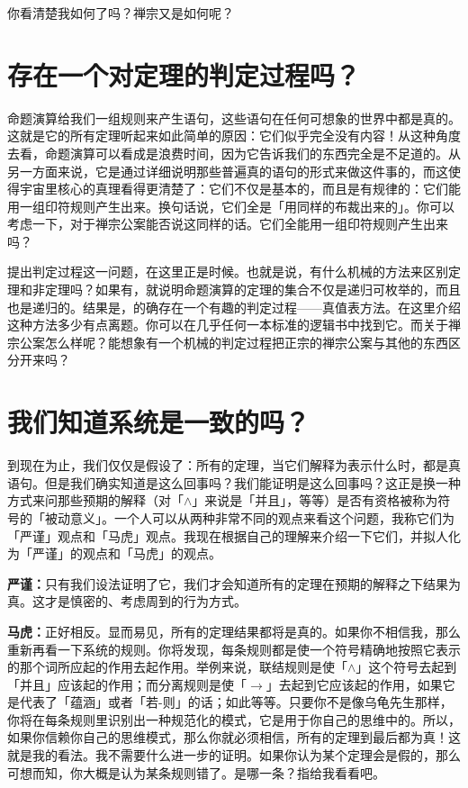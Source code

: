 \documentclass[
  12pt,
  twoside,
  openright,
  oldfontcommands,
]{memoir}
\newcommand{\dialogname}[1]{{\heifamily\bfseries #1}}
\begin{document}
你看清楚我如何了吗？禅宗又是如何呢？

\section{存在一个对定理的判定过程吗？}

命题演算给我们一组规则来产生语句，这些语句在任何可想象的世界中都是真的。这就是它的所有定理听起来如此简单的原因：它们似乎完全没有内容！从这种角度去看，命题演算可以看成是浪费时间，因为它告诉我们的东西完全是不足道的。从另一方面来说，它是通过详细说明那些普遍真的语句的形式来做这件事的，而这使得宇宙里核心的真理看得更清楚了：它们不仅是基本的，而且是有规律的：它们能用一组印符规则产生出来。换句话说，它们全是「用同样的布裁出来的」。你可以考虑一下，对于禅宗公案能否说这同样的话。它们全能用一组印符规则产生出来吗？

提出判定过程这一问题，在这里正是时候。也就是说，有什么机械的方法来区别定理和非定理吗？如果有，就说明命题演算的定理的集合不仅是递归可枚举的，而且也是递归的。结果是，的确存在一个有趣的判定过程------真值表方法。在这里介绍这种方法多少有点离题。你可以在几乎任何一本标准的逻辑书中找到它。而关于禅宗公案怎么样呢？能想象有一个机械的判定过程把正宗的禅宗公案与其他的东西区分开来吗？

\section{我们知道系统是一致的吗？}

到现在为止，我们仅仅是假设了：所有的定理，当它们解释为表示什么时，都是真语句。但是我们确实知道是这么回事吗？我们能证明是这么回事吗？这正是换一种方式来问那些预期的解释（对「$\wedge$」来说是「并且」，等等）是否有资格被称为符号的「被动意义」。一个人可以从两种非常不同的观点来看这个问题，我称它们为「严谨」观点和「马虎」观点。我现在根据自己的理解来介绍一下它们，并拟人化为「严谨」的观点和「马虎」的观点。

\dialogname{严谨：}只有我们设法证明了它，我们才会知道所有的定理在预期的解释之下结果为真。这才是慎密的、考虑周到的行为方式。

\dialogname{马虎：}正好相反。显而易见，所有的定理结果都将是真的。如果你不相信我，那么重新再看一下系统的规则。你将发现，每条规则都是使一个符号精确地按照它表示的那个词所应起的作用去起作用。举例来说，联结规则是使「$\wedge$」这个符号去起到「并且」应该起的作用；而分离规则是使「$\rightarrow$」去起到它应该起的作用，如果它是代表了「蕴涵」或者「若-则」的话；如此等等。只要你不是像乌龟先生那样，你将在每条规则里识别出一种规范化的模式，它是用于你自己的思维中的。所以，如果你信赖你自己的思维模式，那么你就必须相信，所有的定理到最后都为真！这就是我的看法。我不需要什么进一步的证明。如果你认为某个定理会是假的，那么可想而知，你大概是认为某条规则错了。是哪一条？指给我看看吧。
\end{document}

